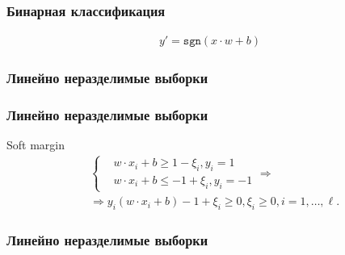 \documentclass[14pt]{beamer}
\begin{document}
\begin{frame}
\frametitle{Бинарная классификация}
\begin{align*}
  y' = \mathtt{sgn}(x \cdot w + b)
\end{align*}
\end{frame}

\begin{frame}
\frametitle{Линейно неразделимые выборки}
\end{frame}

\begin{frame}
\frametitle{Линейно неразделимые выборки}
Soft margin
\begin{align*}
  &\begin{cases}
    &w \cdot x_i + b \geqslant 1 - \xi_i, y_i = 1\\
    &w \cdot x_i + b \leqslant -1 + \xi_i, y_i = -1
  \end{cases}\Rightarrow\\
  &\Rightarrow y_i (w \cdot x_i + b) - 1 + \xi_i \geqslant 0, \xi_i \geqslant 0,
    i = 1, \ldots, \ell.
\end{align*}
\end{frame}

\begin{frame}
\frametitle{Линейно неразделимые выборки}
\end{frame}
\end{document}
